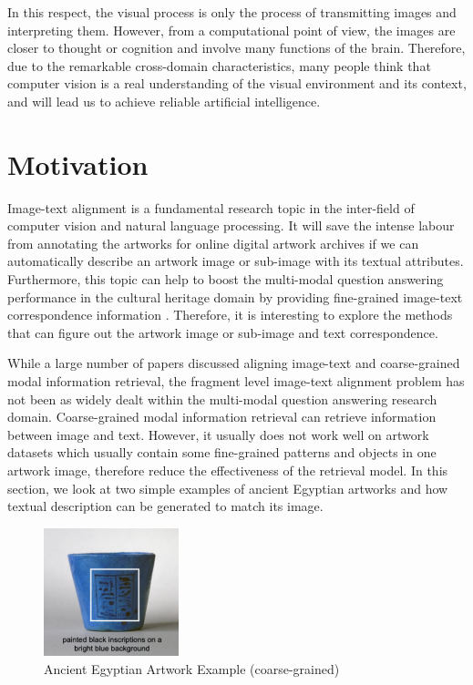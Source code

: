 In this respect, the visual process is only the process of transmitting images and interpreting them. However, from a computational point of view, the images are closer to thought or cognition and involve many functions of the brain. Therefore, due to the remarkable cross-domain characteristics, many people think that computer vision is a real understanding of the visual environment and its context, and will lead us to achieve reliable artificial intelligence.

\section{Motivation}
Image-text alignment is a fundamental research topic in the inter-field of computer vision and natural language processing. It will save the intense labour from annotating the artworks for online
digital artwork archives if we can automatically describe an artwork image or sub-image with its textual attributes. Furthermore, this topic can help to boost the multi-modal question answering performance in the cultural heritage domain by providing fine-grained image-text correspondence information \cite{mqa}. Therefore, it is interesting to explore the methods that can figure out the artwork image or sub-image and text correspondence.

While a large number of papers discussed aligning image-text and coarse-grained modal information retrieval, the fragment level image-text alignment problem has not been as widely dealt within the multi-modal question answering research domain. Coarse-grained modal information retrieval can retrieve information between image and text. However, it usually does not work well on artwork datasets which usually contain some fine-grained patterns and objects in one artwork image, therefore reduce the effectiveness of the retrieval model. In this section, we look at two simple examples of ancient Egyptian artworks and how textual description can be generated to match its image.

\begin{figure}[h!]
\centering
\includegraphics[width=0.35\textwidth]{artwork_fine1.pdf}
\caption{Ancient Egyptian Artwork Example (coarse-grained)}
\label{fig:artwork1}
\end{figure}

